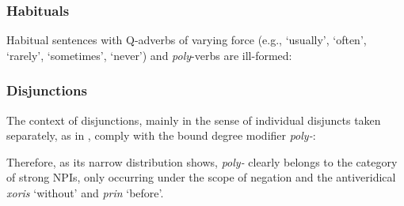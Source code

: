 \documentclass[output=paper]{langscibook}
\begin{document}
\begin{exe}
        \label{gia:ex15}
\end{exe}

\subsubsection{Habituals}

\begin{sloppypar}
\noindent Habitual sentences with Q-adverbs of varying force (e.g., `usually', `often', `rarely', `sometimes', `never') and \textit{poly}-verbs are ill-formed:
\end{sloppypar}

\begin{exe}
        \label{gia:ex16}
\end{exe}

\subsubsection{Disjunctions}

\noindent The context of disjunctions, mainly in the sense of individual disjuncts taken separately, as in , comply with the bound degree modifier \textit{poly-}:

\begin{exe}
        \label{gia:ex17}
\end{exe}

\noindent Therefore, as its narrow distribution shows, \textit{poly-} clearly belongs to the category of strong NPIs, only occurring under the scope of negation and the antiveridical \textit{xoris} ‘without’ and \textit{prin} `before'.

\end{document}
